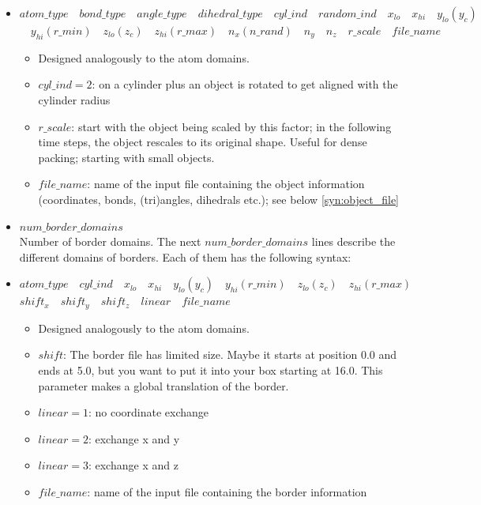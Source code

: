 \documentclass[a4paper,10pt]{scrreprt}
\begin{document}
\begin{itemize}
\item $atom\_type \quad bond\_type \quad angle\_type \quad dihedral\_type \quad cyl\_ind \quad random\_ind \quad x_{lo} \quad x_{hi} \quad y_{lo}(y_c)$\\$\quad y_{hi}(r\_min) \quad z_{lo}(z_c) \quad z_{hi}(r\_max) \quad n_x(n\_rand) \quad n_y \quad n_z \quad r\_scale \quad file\_name$
	\begin{itemize}
	\item Designed analogously to the atom domains.
	\item $cyl\_ind = 2$: on a cylinder plus an object is rotated to get aligned with the cylinder radius
	\item $r\_scale$: start with the object being scaled by this factor; in the following time steps, the object rescales to its original shape. Useful for dense packing; starting with small objects.
	\item $file\_name$: name of the input file containing the object information (coordinates, bonds, (tri)angles, dihedrals etc.); see below \ref{syn:object_file}
	\end{itemize}

\item $num\_border\_domains$ \\
	{Number of border domains. The next $num\_border\_domains$ lines describe the different domains of borders. Each of them has the following syntax:}

\item $atom\_type \quad cyl\_ind \quad x_{lo} \quad x_{hi} \quad y_{lo}(y_c) \quad y_{hi}(r\_min) \quad z_{lo}(z_c) \quad z_{hi}(r\_max)$\\$shift_x \quad shift_y \quad shift_z \quad linear \quad file\_name$
	\begin{itemize}
	\item Designed analogously to the atom domains.
	\item $shift$: The border file has limited size. Maybe it starts at position 0.0 and ends at 5.0, but you want to put it into your box starting at 16.0. This parameter makes a global translation of the border.
	\item $linear = 1$: no coordinate exchange
	\item $linear = 2$: exchange x and y
	\item $linear = 3$: exchange x and z
	\item $file\_name$: name of the input file containing the border information
	\end{itemize}

\end{itemize}
\end{document}
